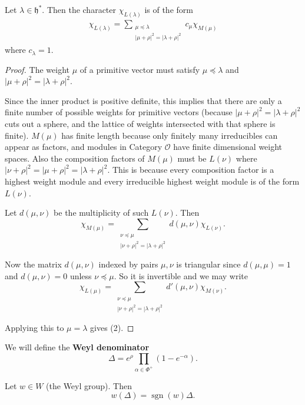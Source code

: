 \documentclass[12pt]{article}
\begin{document}
\begin{proposition}\label{prop:char-irr}
    Let $\lambda \in \mathfrak{h}^*$. Then the character $\chi_{L(\lambda)}$ is of the form
    \begin{align}
        \chi_{L(\lambda)} = \sum_{\substack{\mu \preceq \lambda \\ |\mu+\rho|^2 = |\lambda+\rho|^2}} c_\mu \chi_{M(\mu)}
    \end{align}
    where $c_\lambda = 1$.
\end{proposition}

\begin{proof}
    The weight $\mu$ of a primitive vector must satisfy $\mu \preceq \lambda$ and
    $|\mu+\rho|^2 = |\lambda+\rho|^2$.

    Since the inner product is positive definite, this implies that there are only a finite number of possible weights for primitive vectors (because $|\mu+\rho|^2 = |\lambda+\rho|^2 $ cuts out a sphere, and the lattice of weights intersected with that sphere is finite). $M(\mu)$ has finite length because only finitely many irreducibles can appear as factors, and modules in Category $\mathcal{O}$ have finite dimensional weight spaces. Also the composition factors of $M(\mu)$ must be $L(\nu)$ where $|\nu+\rho|^2 = |\mu+\rho|^2 = |\lambda+\rho|^2$. This is because every composition factor is a highest weight module and every irreducible highest weight module is of the form $L(\nu)$.

    Let $d(\mu,\nu)$ be the multiplicity of such $L(\nu)$. Then
    \[
        \chi_{M(\mu)} = \sum_{\substack{\nu \preceq \mu \\ |\nu+\rho|^2 = |\lambda+\rho|^2}}
        d(\mu,\nu)\chi_{L(\nu)}.
    \]

    Now the matrix $d(\mu,\nu)$ indexed by pairs $\mu,\nu$ is triangular since
    $d(\mu,\mu) = 1$ and $d(\mu,\nu) = 0$ unless $\nu \preceq \mu$. So it is invertible and we may write
    \[
        \chi_{L(\mu)} = \sum_{\substack{\nu \preceq \mu \\ |\nu+\rho|^2 = |\lambda+\rho|^2}}
        d'(\mu,\nu)\chi_{M(\nu)}.
    \]

    Applying this to $\mu = \lambda$ gives (2).
\end{proof}

We will define the \textbf{Weyl denominator}
\[
    \Delta = e^\rho \prod_{\alpha \in \Phi^+} (1 - e^{-\alpha}).
\]

\begin{lemma}
    Let $w \in W$ (the Weyl group). Then
    \[
        w(\Delta) = \operatorname{sgn}(w)\Delta.
    \]
\end{lemma}
\end{document}
